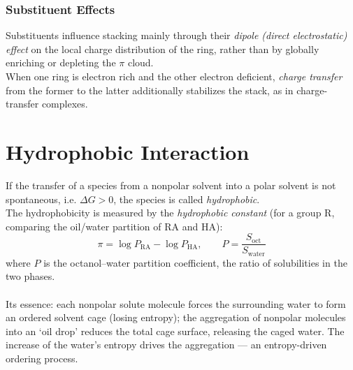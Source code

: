 	\subsubsection{Substituent Effects}

		Substituents influence stacking mainly through their \emph{dipole (direct electrostatic) effect} on the local charge distribution of the ring, rather than by globally enriching or depleting the $\pi$ cloud. \\
		When one ring is electron rich and the other electron deficient, \emph{charge transfer} from the former to the latter additionally stabilizes the stack, as in charge-transfer complexes.

\section{Hydrophobic Interaction}\label{hydrophobic}

	If the transfer of a species from a nonpolar solvent into a polar solvent is not spontaneous, i.e. $\Delta G > 0$, the species is called \emph{hydrophobic}. \\
	The hydrophobicity is measured by the \emph{hydrophobic constant} (for a group R, comparing the oil/water partition of RA and HA):
	\[\pi = \log P_{\text{RA}} - \log P_{\text{HA}}, \qquad P = \frac{S_{\text{oct}}}{S_{\text{water}}}\]
	where $P$ is the octanol--water partition coefficient, the ratio of solubilities in the two phases. \\\ \\
	Its essence: each nonpolar solute molecule forces the surrounding water to form an ordered solvent cage (losing entropy); the aggregation of nonpolar molecules into an `oil drop' reduces the total cage surface, releasing the caged water. The increase of the water's entropy drives the aggregation --- an entropy-driven ordering process.
